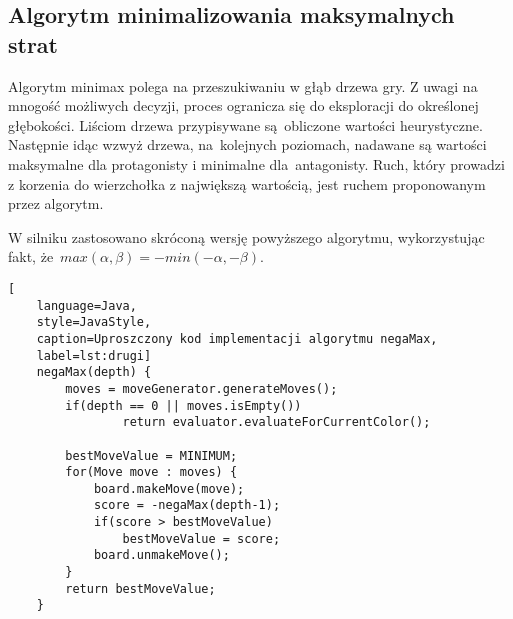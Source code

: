 \subsection{Algorytm minimalizowania maksymalnych strat}
\label{subsec:algorytm-minimalizowania-maksymalnych-strat}

Algorytm minimax polega na przeszukiwaniu w głąb drzewa gry.
Z uwagi na mnogość możliwych decyzji, proces ogranicza się do eksploracji do określonej głębokości.
Liściom drzewa przypisywane są~obliczone wartości heurystyczne.
Następnie idąc wzwyż drzewa, na~kolejnych poziomach, nadawane są wartości maksymalne dla protagonisty i minimalne dla~antagonisty.
Ruch, który prowadzi z korzenia do wierzchołka z największą wartością, jest ruchem proponowanym przez algorytm.

W silniku zastosowano skróconą wersję powyższego algorytmu, wykorzystując fakt, że~$max(\alpha, \beta) = -min(-\alpha, -\beta)$.

\newpage


\begin{lstlisting}[
    language=Java,
    style=JavaStyle,
    caption=Uproszczony kod implementacji algorytmu negaMax,
    label=lst:drugi]
    negaMax(depth) {
        moves = moveGenerator.generateMoves();
        if(depth == 0 || moves.isEmpty())
                return evaluator.evaluateForCurrentColor();

        bestMoveValue = MINIMUM;
        for(Move move : moves) {
            board.makeMove(move);
            score = -negaMax(depth-1);
            if(score > bestMoveValue)
                bestMoveValue = score;
            board.unmakeMove();
        }
        return bestMoveValue;
    }
\end{lstlisting}



